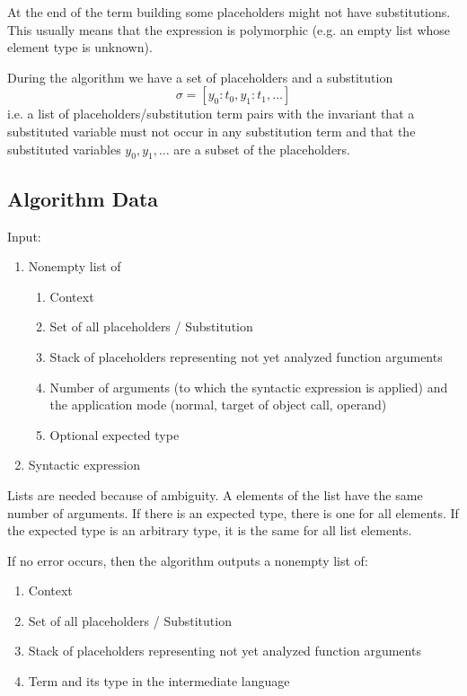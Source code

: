 At the end of the term building some placeholders might not have
substitutions. This usually means that the expression is polymorphic (e.g. an
empty list whose element type is unknown).

During the algorithm we have a set of placeholders and a substitution
$$
\sigma = [y_0: t_0, y_1: t_1, \ldots]
$$
i.e. a list of placeholders/substitution term pairs with the invariant that a
substituted variable must not occur in any substitution term and that the
substituted variables $y_0, y_1, \ldots$ are a subset of the placeholders.




\subsection{Algorithm Data}


\noindent Input:

\begin{enumerate}

\item Nonempty list of

  \begin{enumerate}

  \item Context

  \item Set of all placeholders / Substitution

  \item Stack of placeholders representing not yet analyzed function arguments

  \item Number of arguments (to which the syntactic expression is applied) and
    the application mode (normal, target of object call, operand)

  \item Optional expected type
  \end{enumerate}

\item Syntactic expression
\end{enumerate}

Lists are needed because of ambiguity. A elements of the list have the same
number of arguments. If there is an expected type, there is one for all
elements. If the expected type is an arbitrary type, it is the same for all
list elements.

If no error occurs, then the algorithm outputs a nonempty list of:

\begin{enumerate}

\item Context

\item Set of all placeholders / Substitution

\item Stack of placeholders representing not yet analyzed function arguments

\item Term and its type in the intermediate language

\end{enumerate}

